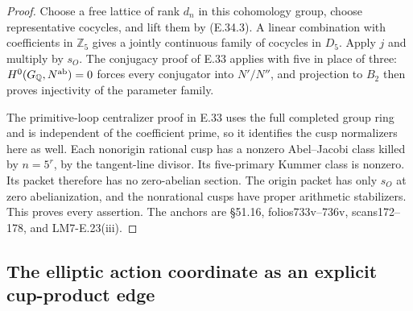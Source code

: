 \documentclass[11pt,oneside]{article}
\begin{document}
\begin{proof}
Choose a free lattice of rank $d_n$
in this cohomology group, choose
representative cocycles, and lift
them by (E.34.3). A linear combination
with coefficients in $\mathbb Z_5$
gives a jointly continuous family of
cocycles in $D_5$. Apply $j$ and
multiply by $s_O$. The conjugacy proof
of E.33 applies with five in place
of three: $H^0(G_{\mathbb Q},N^{\rm ab})=0$
forces every conjugator into $N'/N''$,
and projection to $B_2$ then proves
injectivity of the parameter family.

The primitive-loop centralizer proof
in E.33 uses the full completed
group ring and is independent of
the coefficient prime, so it
identifies the cusp normalizers
here as well. Each nonorigin
rational cusp has a nonzero
Abel--Jacobi class killed by
$n=5^r$, by the tangent-line
divisor. Its five-primary Kummer
class is nonzero. Its packet
therefore has no zero-abelian
section. The origin packet has
only $s_O$ at zero abelianization,
and the nonrational cusps have
proper arithmetic stabilizers.
This proves every assertion.
The anchors are \S51.16,
folios733v--736v, scans172--178,
and LM7-E.23(iii).
\end{proof}

\subsection{The elliptic action coordinate as an explicit cup-product edge}
\end{document}
